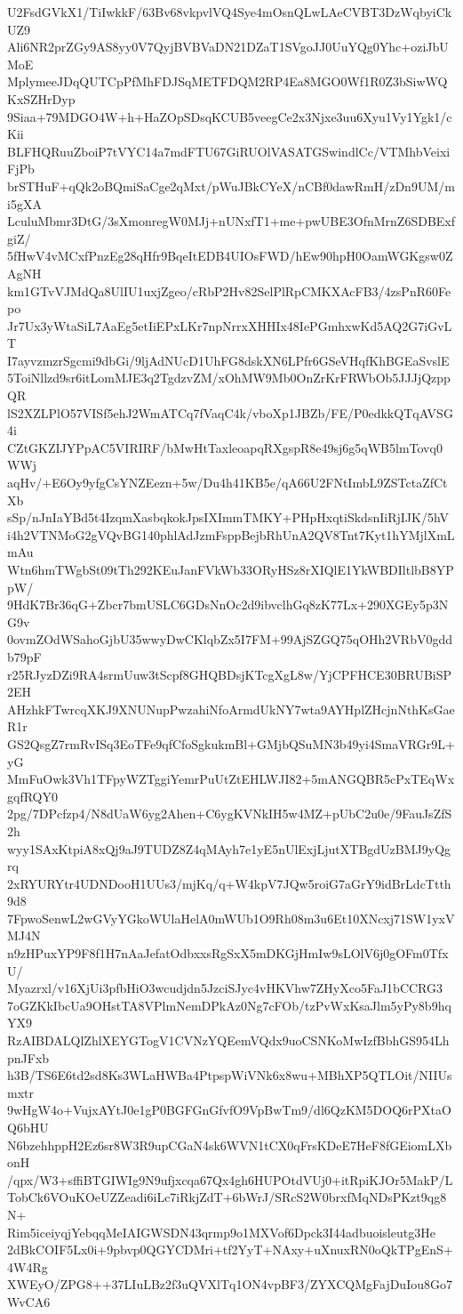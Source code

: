 U2FsdGVkX1/TiIwkkF/63Bv68vkpvlVQ4Sye4mOsnQLwLAeCVBT3DzWqbyiCkUZ9
Ali6NR2prZGy9AS8yy0V7QyjBVBVaDN21DZaT1SVgoJJ0UuYQg0Yhc+oziJbUMoE
MplymeeJDqQUTCpPfMhFDJSqMETFDQM2RP4Ea8MGO0Wf1R0Z3bSiwWQKxSZHrDyp
9Siaa+79MDGO4W+h+HaZOpSDsqKCUB5veegCe2x3Njxe3uu6Xyu1Vy1Ygk1/cKii
BLFHQRuuZboiP7tVYC14a7mdFTU67GiRUOlVASATGSwindlCc/VTMhbVeixiFjPb
brSTHuF+qQk2oBQmiSaCge2qMxt/pWuJBkCYeX/nCBf0dawRmH/zDn9UM/mi5gXA
LculuMbmr3DtG/3sXmonregW0MJj+nUNxfT1+me+pwUBE3OfnMrnZ6SDBExfgiZ/
5fHwV4vMCxfPnzEg28qHfr9BqeItEDB4UIOsFWD/hEw90hpH0OamWGKgsw0ZAgNH
km1GTvVJMdQa8UlIU1uxjZgeo/cRbP2Hv82SelPlRpCMKXAcFB3/4zsPnR60Fepo
Jr7Ux3yWtaSiL7AaEg5etIiEPxLKr7npNrrxXHHIx48IePGmhxwKd5AQ2G7iGvLT
I7ayvzmzrSgcmi9dbGi/9ljAdNUcD1UhFG8dskXN6LPfr6GSeVHqfKhBGEaSvslE
5ToiNllzd9sr6itLomMJE3q2TgdzvZM/xOhMW9Mb0OnZrKrFRWbOb5JJJjQzppQR
lS2XZLPlO57VISf5ehJ2WmATCq7fVaqC4k/vboXp1JBZb/FE/P0edkkQTqAVSG4i
CZtGKZIJYPpAC5VIRIRF/bMwHtTaxleoapqRXgspR8e49sj6g5qWB5lmTovq0WWj
aqHv/+E6Oy9yfgCsYNZEezn+5w/Du4h41KB5e/qA66U2FNtImbL9ZSTctaZfCtXb
sSp/nJnIaYBd5t4IzqmXasbqkokJpsIXImmTMKY+PHpHxqtiSkdsnIiRjIJK/5hV
i4h2VTNMoG2gVQvBG140phlAdJzmFsppBejbRhUnA2QV8Tnt7Kyt1hYMjlXmLmAu
Wtn6hmTWgbSt09tTh292KEuJanFVkWb33ORyHSz8rXIQlE1YkWBDIltlbB8YPpW/
9HdK7Br36qG+Zbcr7bmUSLC6GDsNnOc2d9ibvclhGq8zK77Lx+290XGEy5p3NG9v
0ovmZOdWSahoGjbU35wwyDwCKlqbZx5I7FM+99AjSZGQ75qOHh2VRbV0gddb79pF
r25RJyzDZi9RA4srmUuw3tScpf8GHQBDsjKTcgXgL8w/YjCPFHCE30BRUBiSP2EH
AHzhkFTwrcqXKJ9XNUNupPwzahiNfoArmdUkNY7wta9AYHplZHcjnNthKsGaeR1r
GS2QsgZ7rmRvISq3EoTFe9qfCfoSgkukmBl+GMjbQSuMN3b49yi4SmaVRGr9L+yG
MmFuOwk3Vh1TFpyWZTggiYemrPuUtZtEHLWJI82+5mANGQBR5cPxTEqWxgqfRQY0
2pg/7DPcfzp4/N8dUaW6yg2Ahen+C6ygKVNkIH5w4MZ+pUbC2u0e/9FauJsZfS2h
wyy1SAxKtpiA8xQj9aJ9TUDZ8Z4qMAyh7e1yE5nUlExjLjutXTBgdUzBMJ9yQgrq
2xRYURYtr4UDNDooH1UUs3/mjKq/q+W4kpV7JQw5roiG7aGrY9idBrLdcTtth9d8
7FpwoSenwL2wGVyYGkoWUlaHelA0mWUb1O9Rh08m3u6Et10XNcxj71SW1yxVMJ4N
n9zHPuxYP9F8f1H7nAaJefatOdbxxsRgSxX5mDKGjHmIw9sLOlV6j0gOFm0TfxU/
Myazrxl/v16XjUi3pfbHiO3wcudjdn5JzciSJyc4vHKVhw7ZHyXco5FaJ1bCCRG3
7oGZKkIbcUa9OHstTA8VPlmNemDPkAz0Ng7cFOb/tzPvWxKsaJlm5yPy8b9hqYX9
RzAIBDALQlZhlXEYGTogV1CVNzYQEemVQdx9uoCSNKoMwIzfBbhGS954LhpnJFxb
h3B/TS6E6td2sd8Ks3WLaHWBa4PtpspWiVNk6x8wu+MBhXP5QTLOit/NIIUsmxtr
9wHgW4o+VujxAYtJ0e1gP0BGFGnGfvfO9VpBwTm9/dl6QzKM5DOQ6rPXtaOQ6bHU
N6bzehhppH2Ez6sr8W3R9upCGaN4sk6WVN1tCX0qFrsKDeE7HeF8fGEiomLXbonH
/qpx/W3+sffiBTGIWIg9N9ufjxcqa67Qx4gh6HUPOtdVUj0+itRpiKJOr5MakP/L
TobCk6VOuKOeUZZeadi6iLc7iRkjZdT+6bWrJ/SRcS2W0brxfMqNDsPKzt9qg8N+
Rim5iceiyqjYebqqMeIAIGWSDN43qrmp9o1MXVof6Dpck3I44adbuoisleutg3He
2dBkCOIF5Lx0i+9pbvp0QGYCDMri+tf2YyT+NAxy+uXnuxRN0oQkTPgEnS+4W4Rg
XWEyO/ZPG8++37LIuLBz2f3uQVXlTq1ON4vpBF3/ZYXCQMgFajDuIou8Go7WvCA6
